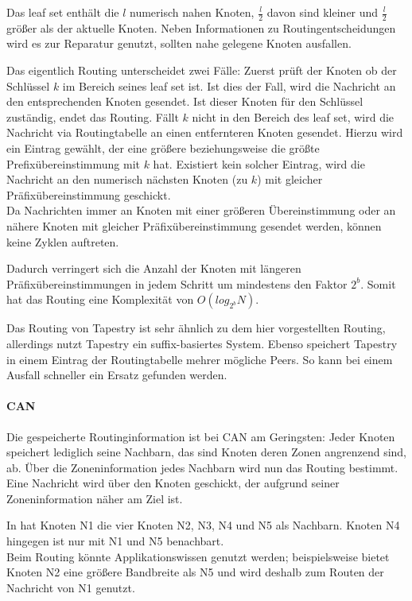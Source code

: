 Das leaf set enthält die $l$ numerisch nahen Knoten, $\frac{l}{2}$ davon sind kleiner und $\frac{l}{2}$ größer als der aktuelle Knoten. Neben Informationen zu Routingentscheidungen wird es zur Reparatur genutzt, sollten nahe gelegene Knoten ausfallen.

Das eigentlich Routing unterscheidet zwei Fälle: Zuerst prüft der Knoten ob der Schlüssel $k$ im Bereich seines leaf set ist. Ist dies der Fall, wird die Nachricht an den entsprechenden Knoten gesendet. Ist dieser Knoten für den Schlüssel zuständig, endet das Routing. Fällt $k$ nicht in den Bereich des leaf set, wird die Nachricht via Routingtabelle an einen entfernteren Knoten gesendet. Hierzu wird ein Eintrag gewählt, der eine größere beziehungsweise die größte Prefixübereinstimmung mit $k$ hat. Existiert kein solcher Eintrag, wird die Nachricht an den numerisch nächsten Knoten (zu $k$) mit gleicher Präfixübereinstimmung geschickt.\\
Da Nachrichten immer an Knoten mit einer größeren Übereinstimmung oder an nähere Knoten mit gleicher Präfixübereinstimmung gesendet werden, können keine Zyklen auftreten.

Dadurch verringert sich die Anzahl der Knoten mit längeren Präfixübereinstimmungen in jedem Schritt um mindestens den Faktor $2^b$. Somit hat das Routing eine Komplexität von $O(log_{2^b} N)$.

Das Routing von Tapestry ist sehr ähnlich zu dem hier vorgestellten Routing, allerdings nutzt Tapestry ein suffix-basiertes System. Ebenso speichert Tapestry in einem Eintrag der Routingtabelle mehrer mögliche Peers. So kann bei einem Ausfall schneller ein Ersatz gefunden werden.

\paragraph{CAN} 
Die gespeicherte Routinginformation ist bei CAN am Geringsten: Jeder Knoten speichert lediglich seine Nachbarn, das sind Knoten deren Zonen angrenzend sind, ab. Über die Zoneninformation jedes Nachbarn wird nun das Routing bestimmt. Eine Nachricht wird über den Knoten geschickt, der aufgrund seiner Zoneninformation näher am Ziel ist.

In  hat Knoten N1 die vier Knoten N2, N3, N4 und N5 als Nachbarn. Knoten N4 hingegen ist nur mit N1 und N5 benachbart.\\
Beim Routing könnte Applikationswissen genutzt werden; beispielsweise bietet Knoten N2 eine größere Bandbreite als N5 und wird deshalb zum Routen der Nachricht von N1 genutzt. 

